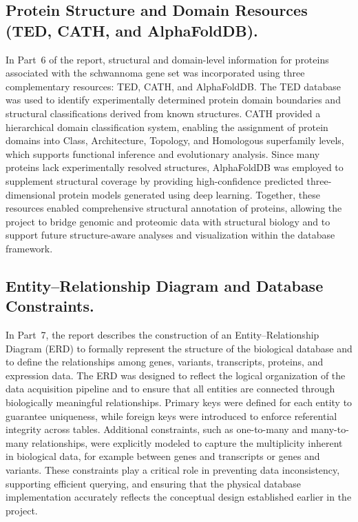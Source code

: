 \documentclass[12pt]{article}
\begin{document}
	\subsection*{Protein Structure and Domain Resources (TED, CATH, and AlphaFoldDB).}
	In Part~6 of the report, structural and domain-level information for proteins associated with the schwannoma gene set was incorporated using three complementary resources: TED, CATH, and AlphaFoldDB. The TED database was used to identify experimentally determined protein domain boundaries and structural classifications derived from known structures. CATH provided a hierarchical domain classification system, enabling the assignment of protein domains into Class, Architecture, Topology, and Homologous superfamily levels, which supports functional inference and evolutionary analysis. Since many proteins lack experimentally resolved structures, AlphaFoldDB was employed to supplement structural coverage by providing high-confidence predicted three-dimensional protein models generated using deep learning. Together, these resources enabled comprehensive structural annotation of proteins, allowing the project to bridge genomic and proteomic data with structural biology and to support future structure-aware analyses and visualization within the database framework.
	
	\subsection*{Entity--Relationship Diagram and Database Constraints.}
	In Part~7, the report describes the construction of an Entity--Relationship Diagram (ERD) to formally represent the structure of the biological database and to define the relationships among genes, variants, transcripts, proteins, and expression data. The ERD was designed to reflect the logical organization of the data acquisition pipeline and to ensure that all entities are connected through biologically meaningful relationships. Primary keys were defined for each entity to guarantee uniqueness, while foreign keys were introduced to enforce referential integrity across tables. Additional constraints, such as one-to-many and many-to-many relationships, were explicitly modeled to capture the multiplicity inherent in biological data, for example between genes and transcripts or genes and variants. These constraints play a critical role in preventing data inconsistency, supporting efficient querying, and ensuring that the physical database implementation accurately reflects the conceptual design established earlier in the project.
	
\end{document}
